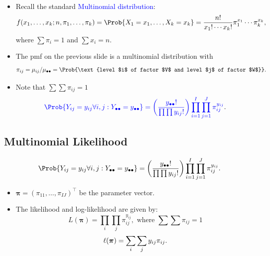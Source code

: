 \documentclass{article}\usepackage[]{graphicx}\usepackage[svgnames]{xcolor}
\providecommand\given{} %
\renewcommand\given{\nonscript\:\delimsize\vert\nonscript\:\mathopen{}}%
\renewcommand\given{\nonscript\:\delimsize\vert\nonscript\:\mathopen{}}%
\renewcommand\given{\nonscript\:\delimsize\vert\nonscript\:\mathopen{}}%
\renewcommand\given{\nonscript\:\delimsize\vert\nonscript\:\mathopen{}}%
\renewcommand\given{\nonscript\:\delimsize\vert\nonscript\:\mathopen{}}%
\renewcommand\given{\nonscript\:\delimsize\vert\nonscript\:\mathopen{}}%
\renewcommand\given{\nonscript\:\delimsize\vert\nonscript\:\mathopen{}}%
\renewcommand\given{\nonscript\:\delimsize\vert\nonscript\:\mathopen{}}%
\renewcommand\given{\nonscript\:\delimsize\vert\nonscript\:\mathopen{}}%
\renewcommand\given{\nonscript\:\delimsize\vert\nonscript\:\mathopen{}}%
\renewcommand\given{\nonscript\:\delimsize\vert\nonscript\:\mathopen{}}%
\let\log\relax%
\renewcommand\given{:}
\providecommand{\Vector}[1]{\bm{#1}}%
\begin{document}
\begin{itemize}
\begin{align*}
            \end{align*}
      \item Recall the standard \textcolor{Blue}{Multinomial distribution}:
            \[ f(x_1,\ldots,x_k;n,\pi_1,\ldots,\pi_k)=\Prob{X_1=x_1,\ldots,X_k=x_k}=\frac{n!}{x_1!\cdots x_k!}\pi_1^{x_1}\cdots \pi_k^{x_k}, \]
            where $ \sum \pi_i=1 $ and $ \sum x_i=n $.
      \item The pmf on the previous slide is a multinomial distribution with
            \[ \pi_{ij}=\mu_{ij}/\mu_{\bullet\bullet}=\Prob{\text{level $i$ of factor $V$ and level $j$ of factor $W$}}. \]
      \item Note that $\sum\sum \pi_{ij}=1$
            \[ \textcolor{Blue}{\Prob{Y_{ij}=y_{ij}\forall i,j\given Y_{\bullet\bullet}=y_{\bullet\bullet}}
                  =\biggl(\frac{y_{\bullet\bullet}!}{\prod\prod y_{ij}!}\biggr)\prod_{i=1}^I \prod_{j=1}^J \pi_{ij}^{y_{ij}}}. \]
\end{itemize}
\subsection*{Multinomial Likelihood}
\[ \Prob{Y_{ij}=y_{ij}\forall i,j\given Y_{\bullet\bullet}=y_{\bullet\bullet}}
      =\biggl(\frac{y_{\bullet\bullet}!}{\prod\prod y_{ij}!}\biggr)\prod_{i=1}^I \prod_{j=1}^J \pi_{ij}^{y_{ij}}. \]
\begin{itemize}
      \item $ \Vector{\pi}=(\pi_{11},\ldots,\pi_{IJ})^\top $ be the parameter vector.
      \item The likelihood and log-likelihood are given by:
            \[ L(\Vector{\pi})=\prod_i\prod_j \pi_{ij}^{y_{ij}},\text{ where }\sum\sum \pi_{ij}=1 \]
            \[ \ell(\Vector{\pi})=\sum_i\sum_j y_{ij}\log{\pi_{ij}}. \]
\end{itemize}
\end{document}
